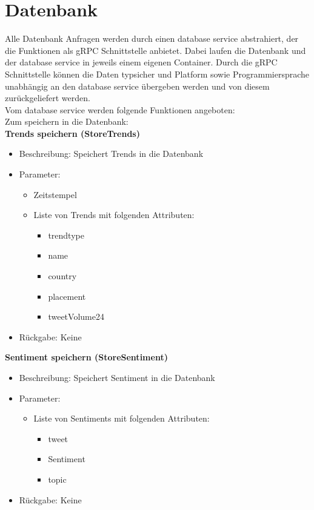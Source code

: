 \documentclass[conference]{IEEEtran}
\begin{document}
\section{Datenbank}
Alle Datenbank Anfragen werden durch einen database service abstrahiert, der die Funktionen als gRPC Schnittstelle anbietet. Dabei laufen die Datenbank und der database service in jeweils einem eigenen Container. 
Durch die gRPC Schnittstelle können die Daten typsicher und Platform sowie Programmiersprache unabhängig an den database service übergeben werden und von diesem zurückgeliefert werden.
\\
Vom database service werden folgende Funktionen angeboten:
\\
Zum speichern in die Datenbank:
\\
\smallskip
\textbf{Trends speichern (StoreTrends)}
\begin{itemize}
    \item Beschreibung: Speichert Trends in die Datenbank
    \item Parameter:
        \begin{itemize}
            \item Zeitstempel
            \item Liste von Trends mit folgenden Attributen:
                \begin{itemize}
                    \item trendtype
                    \item name
                    \item country
                    \item placement
                    \item tweetVolume24
                \end{itemize}
        \end{itemize}
    \item Rückgabe: Keine
\end{itemize}

\smallskip
\textbf{Sentiment speichern (StoreSentiment)}
\begin{itemize}
    \item Beschreibung: Speichert Sentiment in die Datenbank
    \item Parameter:
        \begin{itemize}
            \item Liste von Sentiments mit folgenden Attributen:
                \begin{itemize}
                    \item tweet
                    \item Sentiment
                    \item topic
                \end{itemize}
        \end{itemize}
    \item Rückgabe: Keine
\end{itemize}
\end{document}

